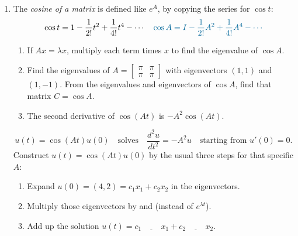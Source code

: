 \documentclass[14pt, a4paper]{article}
\begin{document}
\begin{enumerate}[resume]
    \item The \textit{cosine of a matrix} is defined like $e^A$, by copying the series for $\cos t$:
          \[
              \cos t = 1 - \frac{1}{2!}t^2 + \frac{1}{4!}t^4 - \cdots \quad \textcolor{blue!60!green}{\cos A = I - \frac{1}{2!}A^2 + \frac{1}{4!}A^4 - \cdots}
          \]
          \begin{enumerate}
              \item If $Ax = \lambda x$, multiply each term times $x$ to find the eigenvalue of $\cos A$.
              \item Find the eigenvalues of $A = \begin{bmatrix} \pi & \pi \\ \pi & \pi \end{bmatrix}$ with eigenvectors $(1, 1)$ and $(1, -1)$. From the eigenvalues and eigenvectors of $\cos A$, find that matrix $C = \cos A$.
              \item The second derivative of $\cos(At)$ is $-A^2 \cos(At)$.
          \end{enumerate}
          \[
              u(t) = \cos(At)u(0) \quad \text{solves} \quad \frac{d^2u}{dt^2} = -A^2u \quad \text{starting from } u'(0) = 0.
          \]
          Construct $u(t) = \cos(At)u(0)$ by the usual three steps for that specific $A$:
          \begin{enumerate}
              \item Expand $u(0) = (4, 2) = c_1 x_1 + c_2 x_2$ in the eigenvectors.
              \item Multiply those eigenvectors by \underline{\hspace{1cm}} and \underline{\hspace{1cm}} (instead of $e^{\lambda t}$).
              \item Add up the solution $u(t) = c_1 \underline{\hspace{1cm}} x_1 + c_2 \underline{\hspace{1cm}} x_2$.
          \end{enumerate}
\end{enumerate}
\end{document}
